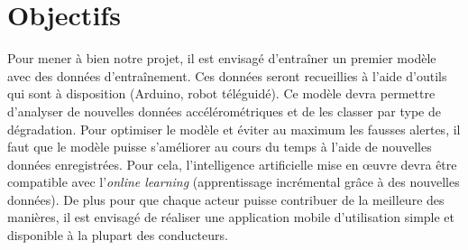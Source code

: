 \section{Objectifs}
Pour mener à bien notre projet, il est envisagé d'entraîner un premier modèle avec des données
d'entraînement. Ces données seront recueillies à l'aide d'outils qui sont à disposition (Arduino, robot téléguidé).
Ce modèle devra permettre d'analyser de nouvelles données accélérométriques et de les classer par type de dégradation.
Pour optimiser le modèle et éviter au maximum les fausses alertes, il faut que le modèle puisse s'améliorer
au cours du temps à l'aide de nouvelles données enregistrées. Pour cela, l'intelligence artificielle mise en \oe{}uvre devra être compatible avec l'\textit{online learning} (apprentissage
incrémental grâce à des nouvelles données).
De plus pour que chaque acteur puisse contribuer de la meilleure des manières, il est envisagé de réaliser une application mobile d'utilisation simple et disponible à la plupart des conducteurs.